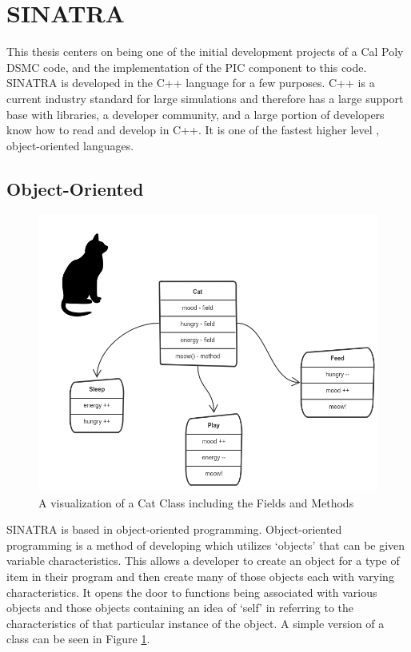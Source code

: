 \section{SINATRA}

This thesis centers on being one of the initial development projects of a Cal Poly DSMC code, and the implementation of the PIC component to this code. SINATRA is developed in the C++ language for a few purposes. C++ is a current industry standard for large simulations and therefore has a large support base with libraries, a developer community, and a large portion of developers know how to read and develop in C++. It is one of the fastest higher level , object-oriented languages.  

\subsection{Object-Oriented}

\begin{figure}
    \centering
    \includegraphics[width=.95\textwidth]{figures/classes.png}
    \caption[A visualization of a Cat Class including the Fields and Methods]{A visualization of a Cat Class including the Fields and Methods  \cite{classes}}
    \label{fig:classes}
\end{figure}

SINATRA is based in object-oriented programming. Object-oriented programming is a method of developing which utilizes `objects' that can be given variable characteristics. This allows a developer to create an object for a type of item in their program and then create many of those objects each with varying characteristics. It opens the door to functions being associated with various objects and those objects containing an idea of `self' in referring to the characteristics of that particular instance of the object. A simple version of a class can be seen in Figure \ref{fig:classes}. \par

